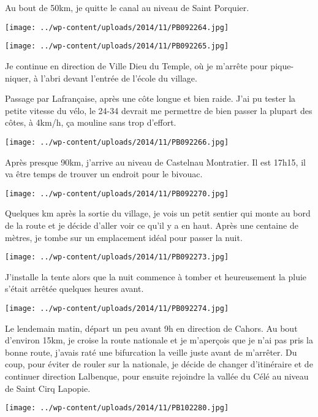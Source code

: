  Au bout de 50km, je quitte le canal au niveau de Saint Porquier.
\begin{center} \texttt{[image: ../wp-content/uploads/2014/11/PB092264.jpg]} \end{center}
\begin{center} \texttt{[image: ../wp-content/uploads/2014/11/PB092265.jpg]} \end{center}

 Je continue en direction de Ville Dieu du Temple, où je m'arrête pour pique-niquer, à l'abri devant l'entrée de l'école du village.

 Passage par Lafrançaise, après une côte longue et bien raide. J'ai pu tester la petite vitesse du vélo, le 24-34 devrait me permettre de bien passer la plupart des côtes, à 4km/h, ça mouline sans trop d'effort.
 
\begin{center} \texttt{[image: ../wp-content/uploads/2014/11/PB092266.jpg]} \end{center}

\pagebreak
 Après presque 90km, j'arrive au niveau de Castelnau Montratier. Il est 17h15, il va être temps de trouver un endroit pour le bivouac.
\begin{center} \texttt{[image: ../wp-content/uploads/2014/11/PB092270.jpg]} \end{center}

 Quelques km après la sortie du village, je vois un petit sentier qui monte au bord de la route et je décide d'aller voir ce qu'il y a en haut. Après une centaine de mètres, je tombe sur un emplacement idéal pour passer la nuit.
\begin{center} \texttt{[image: ../wp-content/uploads/2014/11/PB092273.jpg]} \end{center}

 J'installe la tente alors que la nuit commence à tomber et heureusement la pluie s'était arrêtée quelques heures avant. 
\begin{center} \texttt{[image: ../wp-content/uploads/2014/11/PB092274.jpg]} \end{center}

 Le lendemain matin, départ un peu avant 9h en direction de Cahors. Au bout d'environ 15km, je croise la route nationale et je m'aperçois que je n'ai pas pris la bonne route, j'avais raté une bifurcation la veille juste avant de m'arrêter.
 Du coup, pour éviter de rouler sur la nationale, je décide de changer d'itinéraire et de continuer direction Lalbenque, pour ensuite rejoindre la vallée du Célé au niveau de Saint Cirq Lapopie.
\begin{center} \texttt{[image: ../wp-content/uploads/2014/11/PB102280.jpg]} \end{center}

